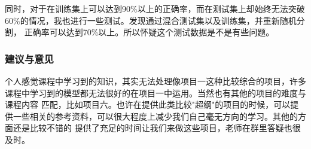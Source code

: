 \documentclass[UTF8]{ctexart}
\begin{document}
同时，对于在训练集上可以达到90\%以上的正确率，而在测试集上却始终无法突破60\%的情况，我也进行一些测试。发现通过混合测试集以及训练集，并重新随机分割，
正确率可以达到70\%以上。所以怀疑这个测试数据是不是有些问题。
\subsubsection{建议与意见}
个人感觉课程中学习到的知识，其实无法处理像项目一这种比较综合的项目，许多课程中学习到的模型都无法很好的在项目一中运用。当然也有其他的项目的难度与课程内容
匹配，比如项目六。也许在提供此类比较"超纲"的项目的时候，可以提供一些相关的参考资料，可以很大程度上减少我们自己毫无方向的学习。其他的方面还是比较不错的
提供了充足的时间让我们来做这些项目，老师在群里答疑也很及时。
\end{document}
